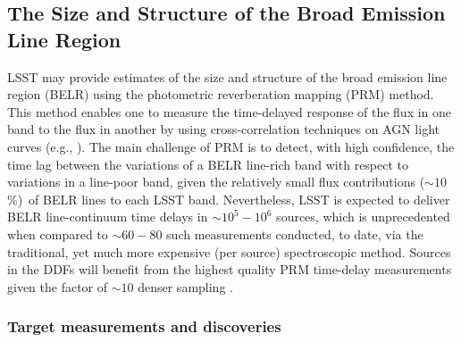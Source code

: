 %
%
%

\subsection{The Size and Structure of the Broad Emission Line Region}\label{sec:AGNBELR}
\def\secname{\chpname:photoRM}\label{sec:\secname}


LSST may provide estimates of the size and structure of the broad
emission line region (BELR) using the photometric reverberation
mapping (PRM) method. This method enables one to measure the
time-delayed response of the flux in one band to the flux
in another by using cross-correlation techniques on AGN light
curves (e.g.,
\citealt{CheloucheEtal2014}).
The main challenge of PRM is to detect,
with high confidence, the time lag between the variations of a BELR
line-rich band with respect to variations in a line-poor band, given
the relatively small flux contributions ($\sim10$\%)~of BELR lines to each
LSST band. Nevertheless, LSST is expected to deliver BELR line-continuum
time delays in $\sim10^5-10^6$ sources, which is unprecedented when
compared to $\sim60-80$ such measurements conducted, to date, via the
traditional, yet much more expensive (per source) spectroscopic method.
Sources in the DDFs will benefit from the highest
quality PRM time-delay measurements given the factor of $\sim10$ denser
sampling \citep{CheloucheEtal2014}.


\subsubsection{Target measurements and discoveries}
\label{sec:\secname:targets}

